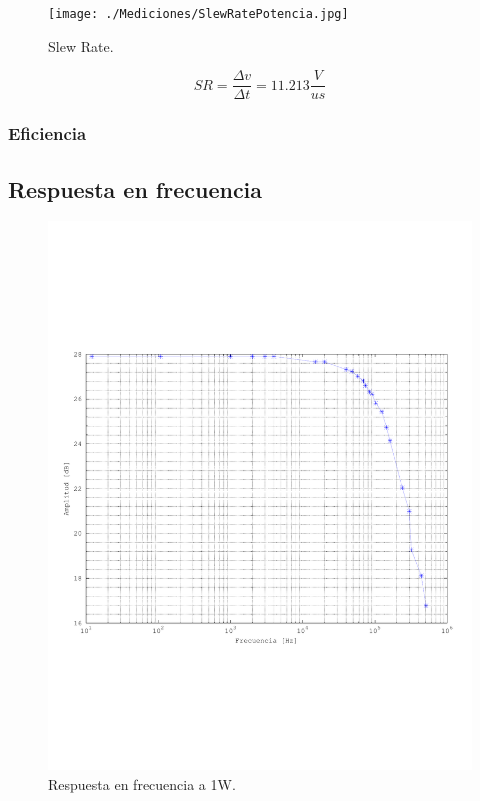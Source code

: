 		\begin{figure}[H]
			\centering
			\texttt{[image: ./Mediciones/SlewRatePotencia.jpg]}
			\caption{Slew Rate.}
		\end{figure}

		\begin{equation*}
			SR  = \frac{\varDelta v}{\varDelta t} = 11.213 \frac{V}{us}
		\end{equation*}

		\subsubsection{Eficiencia}

		\subsection{Respuesta en frecuencia}

		\begin{figure}[H]
			\centering
			\includegraphics[scale=0.5]{./Figuras/bw_total.pdf}
			\caption{Respuesta en frecuencia a 1W.}
		\end{figure}

